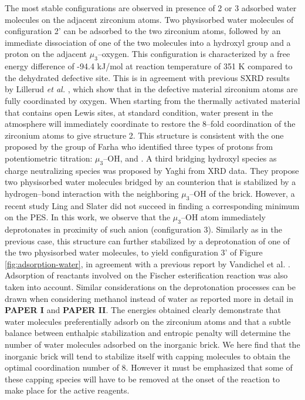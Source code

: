 The most stable configurations are observed in presence of 2 or 3 adsorbed water molecules on the adjacent zirconium atoms. Two physisorbed water molecules of configuration 2’ can be adsorbed to the two zirconium atoms, followed by an immediate dissociation of one of the two molecules into a hydroxyl group and a proton on the adjacent $\mu_3$--oxygen. This configuration is characterized by a free energy difference of -94.4 kJ/mol at reaction temperature of 351 K compared to the dehydrated defective site. This is in agreement with previous SXRD results by Lillerud \textit{et al.} \cite{oien2014detailed}, which show that in the defective material zirconium atoms are fully coordinated by oxygen. When starting from the thermally activated material that contains open Lewis sites, at standard condition, water present in the atmosphere will immediately coordinate to restore the 8--fold coordination of the zirconium atoms to give structure 2. This structure is consistent with the one proposed by the group of Farha \cite{klet2016evaluation} who identified three types of protons from potentiometric titration: $\mu_3$--OH,  and . 
\npar
A third bridging hydroxyl species as charge neutralizing species was proposed by Yaghi \cite{trickett2015definitive} from XRD data. They propose two physisorbed water molecules bridged by an  counterion that is stabilized by a hydrogen--bond interaction with the neighboring $\mu_3$--OH of the brick. However, a recent study Ling and Slater \cite{ling2016dynamic} did not succeed in finding a corresponding minimum on the PES. In this work, we observe that the $\mu_3$--OH atom immediately deprotonates in proximity of such  anion (configuration 3). Similarly as in the previous case, this structure can further stabilized by a deprotonation of one of the two physisorbed water molecules, to yield configuration 3’ of Figure \ref{fig:adsorption-water}, in agreement with a previous report by Vandichel et al. \cite{vandichel2016water}. Adsorption of reactants involved on the Fischer esterification reaction was also taken into account. Similar considerations on the deprotonation processes can be drawn when considering methanol instead of water as reported more in detail in \textbf{PAPER I} and \textbf{PAPER II}. The energies obtained clearly demonstrate that water molecules preferentially adsorb on the zirconium atoms and that a subtle balance between enthalpic stabilization and entropic penalty will determine the number of water molecules adsorbed on the inorganic brick. We here find that the inorganic brick will tend to stabilize itself with capping molecules to obtain the optimal coordination number of 8. However it must be emphasized that some of these capping species will have to be removed at the onset of the reaction to make place for the active reagents. 

